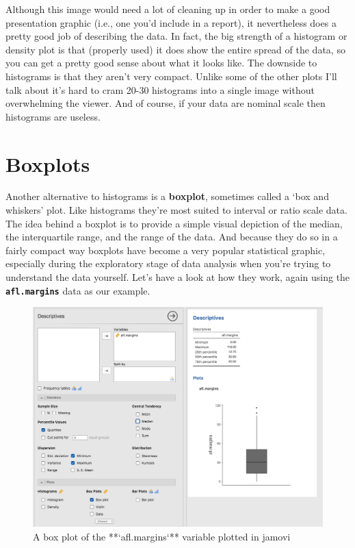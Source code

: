 \documentclass[
]{book}
\begin{document}
Although this image would need a lot of cleaning up in order to make a good presentation graphic (i.e., one you'd include in a report), it nevertheless does a pretty good job of describing the data. In fact, the big strength of a histogram or density plot is that (properly used) it does show the entire spread of the data, so you can get a pretty good sense about what it looks like. The downside to histograms is that they aren't very compact. Unlike some of the other plots I'll talk about it's hard to cram 20-30 histograms into a single image without overwhelming the viewer. And of course, if your data are nominal scale then histograms are useless.

\hypertarget{boxplots}{%
\section{Boxplots}\label{boxplots}}

Another alternative to histograms is a {\textbf{boxplot}}, sometimes called a `box and whiskers' plot. Like histograms they're most suited to interval or ratio scale data. The idea behind a boxplot is to provide a simple visual depiction of the median, the interquartile range, and the range of the data. And because they do so in a fairly compact way boxplots have become a very popular statistical graphic, especially during the exploratory stage of data analysis when you're trying to understand the data yourself. Let's have a look at how they work, again using the \textbf{\texttt{afl.margins}} data as our example.

\begin{figure}

{\centering \includegraphics[width=1\linewidth]{img/graphics/boxplot1} 

}

\caption{A box plot of the **`afl.margins`** variable plotted in jamovi}\label{fig:boxplot1}
\end{figure}
\end{document}
